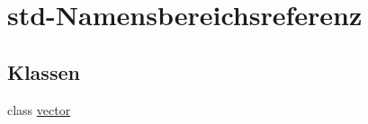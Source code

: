 \hypertarget{namespacestd}{\section{std-\/\-Namensbereichsreferenz}
\label{namespacestd}
}
\subsection*{Klassen}
\begin{DoxyCompactItemize}
\item 
class \hyperlink{classstd_1_1vector}{vector}
\end{DoxyCompactItemize}
